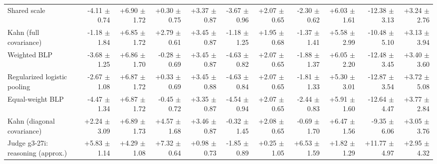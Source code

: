 \begin{tabular}{lrrrrrrrrrr}
Shared scale & -4.11 {\scriptsize $\pm$ 0.74} & +6.90 {\scriptsize $\pm$ 1.72} & +0.30 {\scriptsize $\pm$ 0.75} & +3.37 {\scriptsize $\pm$ 0.87} & -3.67 {\scriptsize $\pm$ 0.96} & +2.07 {\scriptsize $\pm$ 0.65} & -2.30 {\scriptsize $\pm$ 0.62} & +6.03 {\scriptsize $\pm$ 1.61} & -12.38 {\scriptsize $\pm$ 3.13} & +3.24 {\scriptsize $\pm$ 2.76} \\
Kahn (full covariance) & -1.18 {\scriptsize $\pm$ 1.84} & +6.85 {\scriptsize $\pm$ 1.72} & +2.79 {\scriptsize $\pm$ 0.61} & +3.45 {\scriptsize $\pm$ 0.87} & -1.18 {\scriptsize $\pm$ 1.25} & +1.95 {\scriptsize $\pm$ 0.68} & -1.37 {\scriptsize $\pm$ 1.41} & +5.58 {\scriptsize $\pm$ 2.99} & -10.48 {\scriptsize $\pm$ 5.10} & +3.13 {\scriptsize $\pm$ 3.94} \\
Weighted BLP & -3.68 {\scriptsize $\pm$ 1.25} & +6.86 {\scriptsize $\pm$ 1.70} & -0.28 {\scriptsize $\pm$ 0.69} & +3.45 {\scriptsize $\pm$ 0.87} & -4.63 {\scriptsize $\pm$ 0.82} & +2.07 {\scriptsize $\pm$ 0.65} & -1.88 {\scriptsize $\pm$ 1.37} & +6.05 {\scriptsize $\pm$ 2.20} & -12.48 {\scriptsize $\pm$ 3.45} & +3.40 {\scriptsize $\pm$ 3.60} \\
Regularized logistic pooling & -2.67 {\scriptsize $\pm$ 1.08} & +6.87 {\scriptsize $\pm$ 1.72} & +0.33 {\scriptsize $\pm$ 0.69} & +3.45 {\scriptsize $\pm$ 0.88} & -4.63 {\scriptsize $\pm$ 0.84} & +2.07 {\scriptsize $\pm$ 0.65} & -1.81 {\scriptsize $\pm$ 1.33} & +5.30 {\scriptsize $\pm$ 3.01} & -12.87 {\scriptsize $\pm$ 3.54} & +3.72 {\scriptsize $\pm$ 5.08} \\
Equal-weight BLP & -4.47 {\scriptsize $\pm$ 1.34} & +6.87 {\scriptsize $\pm$ 1.72} & -0.45 {\scriptsize $\pm$ 0.72} & +3.35 {\scriptsize $\pm$ 0.87} & -4.54 {\scriptsize $\pm$ 0.94} & +2.07 {\scriptsize $\pm$ 0.65} & -2.44 {\scriptsize $\pm$ 0.83} & +5.91 {\scriptsize $\pm$ 1.60} & -12.64 {\scriptsize $\pm$ 4.47} & +3.77 {\scriptsize $\pm$ 2.84} \\
Kahn (diagonal covariance) & +2.24 {\scriptsize $\pm$ 3.09} & +6.89 {\scriptsize $\pm$ 1.73} & +4.57 {\scriptsize $\pm$ 1.68} & +3.46 {\scriptsize $\pm$ 0.87} & -0.32 {\scriptsize $\pm$ 1.45} & +2.08 {\scriptsize $\pm$ 0.65} & -0.69 {\scriptsize $\pm$ 1.70} & +6.47 {\scriptsize $\pm$ 1.56} & -9.35 {\scriptsize $\pm$ 6.06} & +3.05 {\scriptsize $\pm$ 3.76} \\
Judge g3-27i: reasoning (approx.) & +5.83 {\scriptsize $\pm$ 1.14} & +4.29 {\scriptsize $\pm$ 1.08} & +7.32 {\scriptsize $\pm$ 0.64} & +0.98 {\scriptsize $\pm$ 0.73} & -1.85 {\scriptsize $\pm$ 0.89} & +0.25 {\scriptsize $\pm$ 1.05} & +6.53 {\scriptsize $\pm$ 1.59} & +1.82 {\scriptsize $\pm$ 1.29} & +11.77 {\scriptsize $\pm$ 4.97} & +2.95 {\scriptsize $\pm$ 4.32} \\

\end{tabular}
